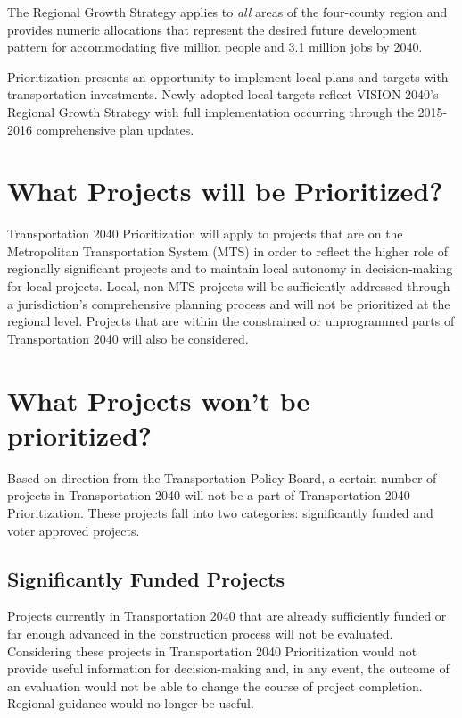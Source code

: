 \documentclass[10pt, letterpaper, final, twoside, onecolumn]{memoir}%
\begin{document}
The Regional Growth Strategy applies to \emph{all} areas of the four-county region and provides numeric allocations that represent the desired future development pattern for accommodating five million people and 3.1 million jobs by 2040.

Prioritization presents an opportunity to implement local plans and targets with transportation investments. Newly adopted local targets reflect VISION 2040’s Regional Growth Strategy with full implementation occurring through the 2015-2016 comprehensive plan updates.

\section{What Projects will be Prioritized?}

Transportation 2040 Prioritization will apply to projects that are on the Metropolitan Transportation System (MTS) in order to reflect the higher role of regionally significant projects and to maintain local autonomy in decision-making for local projects. Local, non-MTS projects will be sufficiently addressed through a jurisdiction’s comprehensive planning process and will not be prioritized at the regional level. Projects that are within the constrained or unprogrammed parts of Transportation 2040 will also be considered. 

\section{What Projects won't be prioritized?}

Based on direction from the Transportation Policy Board, a certain number of projects in Transportation 2040 will not be a part of Transportation 2040 Prioritization. These projects fall into two categories: significantly funded and voter approved projects.

\subsection{Significantly Funded Projects}

Projects currently in Transportation 2040 that are already sufficiently funded or far enough advanced in the construction process will not be evaluated. Considering these projects in Transportation 2040 Prioritization would not provide useful information for decision-making and, in any event, the outcome of an evaluation would not be able to change the course of project completion. Regional guidance would no longer be useful.
\end{document}
